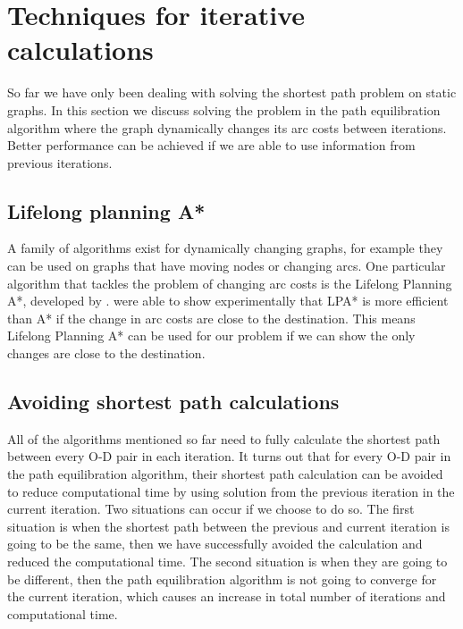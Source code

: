 \section{Techniques for iterative calculations}
So far we have only been dealing with solving the shortest path problem on static graphs.
In this section we discuss solving the problem in the path equilibration algorithm where
the graph dynamically changes its arc costs between iterations.
Better performance can be achieved if we are able to use information from previous iterations.

\subsection{Lifelong planning A*}
A family of algorithms exist for dynamically changing graphs,
for example they can be used on graphs that have moving nodes or changing arcs.
One particular algorithm that tackles the problem of changing arc costs is the Lifelong Planning A*, developed by \citet{LPA*}.
\citet{LPA*} were able to show experimentally that LPA* is more efficient than A* if the change in arc costs are close to the destination.
This means Lifelong Planning A* can be used for our problem if we can show the only changes are close to the destination.

\subsection{Avoiding shortest path calculations} \label{section:avoid}
All of the algorithms mentioned so far need to fully calculate the shortest path between every O-D pair in each iteration.
It turns out that for every O-D pair in the path equilibration algorithm,
their shortest path calculation can be avoided to reduce computational time by using solution from the previous iteration in the current iteration.
Two situations can occur if we choose to do so.
The first situation is when the shortest path between the previous and current iteration is going to be the same,
then we have successfully avoided the calculation and reduced the computational time.
The second situation is when they are going to be different,
then the path equilibration algorithm is not going to converge for the current iteration,
which causes an increase in total number of iterations and computational time.

